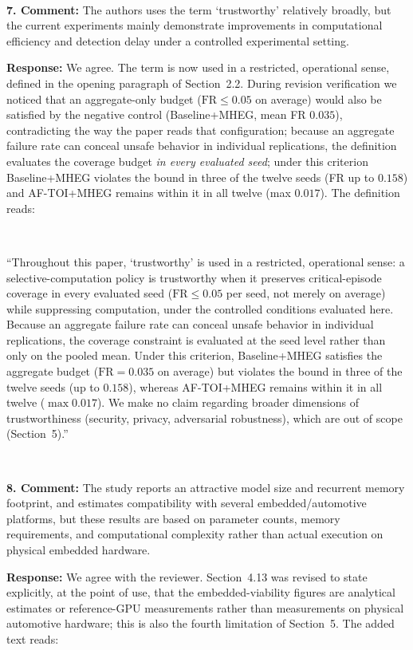 \documentclass[1p,12pt,authoryear]{elsarticle}
\begin{document}
~

\noindent \textbf{7. Comment:} The authors uses the term `trustworthy' relatively broadly, but the current experiments mainly demonstrate improvements in computational efficiency and detection delay under a controlled experimental setting.

\vspace{2mm}
\noindent \textbf{Response:} We agree. The term is now used in a restricted, operational sense, defined in the opening paragraph of Section~2.2. During revision verification we noticed that an aggregate-only budget ($\mathrm{FR}\le 0.05$ on average) would also be satisfied by the negative control (Baseline+MHEG, mean FR $0.035$), contradicting the way the paper reads that configuration; because an aggregate failure rate can conceal unsafe behavior in individual replications, the definition evaluates the coverage budget \emph{in every evaluated seed}; under this criterion Baseline+MHEG violates the bound in three of the twelve seeds (FR up to $0.158$) and AF-TOI+MHEG remains within it in all twelve (max $0.017$). The definition reads:

~

``Throughout this paper, `trustworthy' is used in a restricted, operational sense: a selective-computation policy is trustworthy when it preserves critical-episode coverage in every evaluated seed ($\mathrm{FR} \le 0.05$ per seed, not merely on average) while suppressing computation, under the controlled conditions evaluated here. Because an aggregate failure rate can conceal unsafe behavior in individual replications, the coverage constraint is evaluated at the seed level rather than only on the pooled mean. Under this criterion, Baseline+MHEG satisfies the aggregate budget ($\mathrm{FR}=0.035$ on average) but violates the bound in three of the twelve seeds (up to $0.158$), whereas AF-TOI+MHEG remains within it in all twelve ($\max 0.017$). We make no claim regarding broader dimensions of trustworthiness (security, privacy, adversarial robustness), which are out of scope (Section~5).''

~

\noindent \textbf{8. Comment:} The study reports an attractive model size and recurrent memory footprint, and estimates compatibility with several embedded/automotive platforms, but these results are based on parameter counts, memory requirements, and computational complexity rather than actual execution on physical embedded hardware.

\vspace{2mm}
\noindent \textbf{Response:} We agree with the reviewer. Section~4.13 was revised to state explicitly, at the point of use, that the embedded-viability figures are analytical estimates or reference-GPU measurements rather than measurements on physical automotive hardware; this is also the fourth limitation of Section~5. The added text reads:
\end{document}
